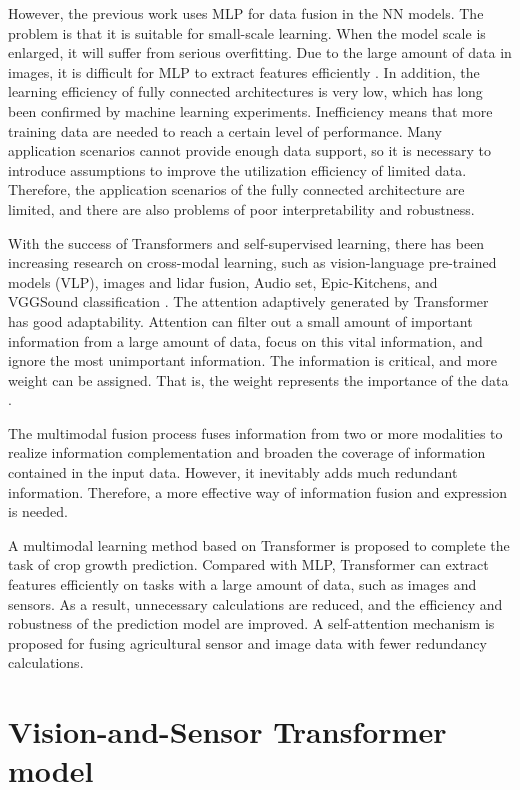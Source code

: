 \documentclass[acmsmall,manuscript, screen, review]{acmart}
\begin{document}
However, the previous work uses MLP for data fusion in the NN models. The problem is that it is suitable for small-scale learning. When the model scale is enlarged, it will suffer from serious overfitting. Due to the large amount of data in images, it is difficult for MLP to extract features efficiently \cite{zhao_battle_2021}. In addition, the learning efficiency of fully connected architectures is very low, which has long been confirmed by machine learning experiments. Inefficiency means that more training data are needed to reach a certain level of performance. Many application scenarios cannot provide enough data support, so it is necessary to introduce assumptions to improve the utilization efficiency of limited data. Therefore, the application scenarios of the fully connected architecture are limited, and there are also problems of poor interpretability and robustness.

With the success of Transformers and self-supervised learning, there has been increasing research on cross-modal learning, such as vision-language pre-trained models (VLP)\cite{clevers_remote_2013}, images and lidar fusion\cite{prakash_multi-modal_2021}, Audio set, Epic-Kitchens, and VGGSound classification \cite{nagrani_attention_nodate}. The attention adaptively generated by Transformer has good adaptability. Attention can filter out a small amount of important information from a large amount of data, focus on this vital information, and ignore the most unimportant information. The information is critical, and more weight can be assigned. That is, the weight represents the importance of the data \cite{vaswani_attention_2017}.

The multimodal fusion process fuses information from two or more modalities to realize information complementation and broaden the coverage of information contained in the input data. However, it inevitably adds much redundant information. Therefore, a more effective way of information fusion and expression is needed.

A multimodal learning method based on Transformer is proposed to complete the task of crop growth prediction. Compared with MLP, Transformer can extract features efficiently on tasks with a large amount of data, such as images and sensors. As a result, unnecessary calculations are reduced, and the efficiency and robustness of the prediction model are improved. A self-attention mechanism is proposed for fusing agricultural sensor and image data with fewer redundancy calculations. 

\section{Vision-and-Sensor Transformer model}
\end{document}

